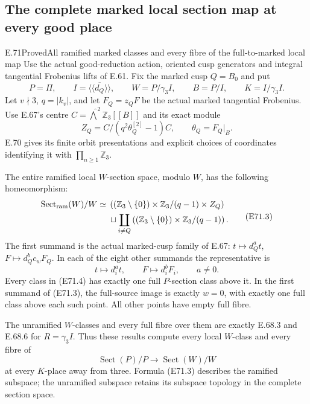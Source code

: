 \subsection{The complete marked local section map at every good place}

\begin{statement}{E.71}{Proved}{All ramified marked classes and every fibre of the full-to-marked local map}
Use the actual good-reduction action, oriented cusp generators and
integral tangential Frobenius lifts of E.61. Fix the marked cusp
$Q=B_0$ and put
\[
 P=\Pi,\qquad I=\overline{\langle\!\langle d_Q\rangle\!\rangle},
 \qquad W=P/\gamma_3I,\qquad B=P/I,\qquad K=I/\gamma_3I.
 \tag{E71.1}
\]
Let $v\nmid3$, $q=|k_v|$, and let $F_Q=z_QF$ be the actual
marked tangential Frobenius. Use E.67's centre
$C=\widehat{\bigwedge}^2\mathbb Z_3[[B]]$ and its exact module
\[
 Z_Q=C/(q^2\theta_Q^{[2]}-1)C,
 \qquad \theta_Q=F_Q|_B.
 \tag{E71.2}
\]
E.70 gives its finite orbit presentations and explicit choices of
coordinates identifying it with $\prod_{n\ge1}\mathbb Z_3$.

The entire ramified local $W$-section space, modulo $W$,
has the following homeomorphism:
\[
 \begin{split}
 \operatorname{Sect}_{\rm ram}(W)/W\simeq{}
 &\left((\mathbb Z_3\setminus\{0\})
       \times\mathbb Z_3/(q-1)\times Z_Q\right)\\
 &\sqcup\coprod_{i\ne Q}
       \left((\mathbb Z_3\setminus\{0\})
       \times\mathbb Z_3/(q-1)\right).
 \end{split}
 \tag{E71.3}
\]
The first summand is the actual marked-cusp family of E.67:
$t\mapsto d_Q^a t$, $F\mapsto d_Q^b c_wF_Q$.
In each of the eight other summands the representative is
\[
            t\longmapsto d_i^a t,\qquad
            F\longmapsto d_i^bF_i,
            \qquad a\ne0.
 \tag{E71.4}
\]
Every class in (E71.4) has exactly one full $P$-section class
above it. In the first summand of (E71.3), the full-source image
is exactly $w=0$, with exactly one full class above each such
point. All other points have empty full fibre.

The unramified $W$-classes and every full fibre over them are
exactly E.68.3 and E.68.6 for $R=\gamma_3I$. Thus these results
compute every local $W$-class and every fibre of
\[
          \operatorname{Sect}(P)/P
                 \longrightarrow\operatorname{Sect}(W)/W
 \tag{E71.5}
\]
at every $K$-place away from three. Formula (E71.3) describes
the ramified subspace; the unramified subspace retains its
subspace topology in the complete section space.


\end{statement}
